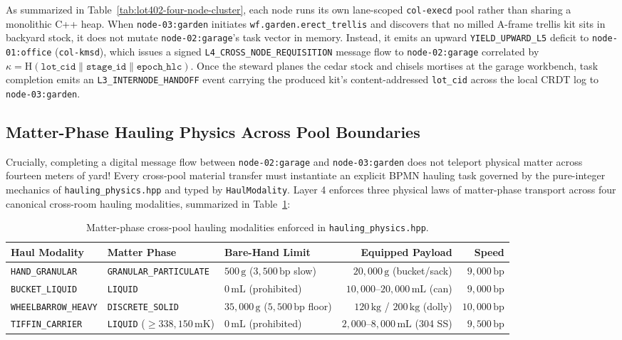 As summarized in Table~\ref{tab:lot402-four-node-cluster}, each node runs its own lane-scoped
\texttt{col-execd} pool rather than sharing a monolithic C++ heap. When
\texttt{node-03:garden} initiates \texttt{wf.garden.erect\_trellis} and discovers that no
milled A-frame trellis kit sits in backyard stock, it does not mutate
\texttt{node-02:garage}'s task vector in memory. Instead, it emits an upward
\texttt{YIELD\_UPWARD\_L5} deficit to \texttt{node-01:office} (\texttt{col-kmsd}), which
issues a signed \texttt{L4\_CROSS\_NODE\_REQUISITION} message flow to \texttt{node-02:garage}
correlated by $\kappa = \mathrm{H}(\texttt{lot\_cid} \parallel \texttt{stage\_id} \parallel
\texttt{epoch\_hlc})$. Once the steward planes the cedar stock and chisels mortises at the
garage workbench, task completion emits an \texttt{L3\_INTERNODE\_HANDOFF} event carrying the
produced kit's content-addressed \texttt{lot\_cid} across the local CRDT log
\parencite{shapiro2011crdt} to \texttt{node-03:garden}.

\subsection{Matter-Phase Hauling Physics Across Pool Boundaries}

Crucially, completing a digital message flow between \texttt{node-02:garage} and
\texttt{node-03:garden} does not teleport physical matter across fourteen meters of yard!
Every cross-pool material transfer must instantiate an explicit BPMN hauling task governed by
the pure-integer mechanics of \texttt{hauling\_physics.hpp} and typed by \texttt{HaulModality}.
Layer 4 enforces three physical laws of matter-phase transport across four canonical
cross-room hauling modalities, summarized in Table~\ref{tab:haul-modality-laws}:

\begin{table}[htbp]
\centering
\caption{Matter-phase cross-pool hauling modalities enforced in \texttt{hauling\_physics.hpp}.}
\label{tab:haul-modality-laws}
\footnotesize
\begin{tabular}{@{}lllrr@{}}
\toprule
\textbf{Haul Modality} & \textbf{Matter Phase} & \textbf{Bare-Hand Limit} & \textbf{Equipped Payload} & \textbf{Speed} \\
\midrule
\texttt{HAND\_GRANULAR} & \texttt{GRANULAR\_PARTICULATE} & $500\,\mathrm{g}$ ($3{,}500\,\mathrm{bp}$ slow) & $20{,}000\,\mathrm{g}$ (bucket/sack) & $9{,}000\,\mathrm{bp}$ \\
\texttt{BUCKET\_LIQUID} & \texttt{LIQUID} & $0\,\mathrm{mL}$ (prohibited) & $10{,}000\text{--}20{,}000\,\mathrm{mL}$ (can) & $9{,}000\,\mathrm{bp}$ \\
\texttt{WHEELBARROW\_HEAVY} & \texttt{DISCRETE\_SOLID} & $35{,}000\,\mathrm{g}$ ($5{,}500\,\mathrm{bp}$ floor) & $120\,\mathrm{kg}$ / $200\,\mathrm{kg}$ (dolly) & $10{,}000\,\mathrm{bp}$ \\
\texttt{TIFFIN\_CARRIER} & \texttt{LIQUID} ($\ge 338{,}150\,\mathrm{mK}$) & $0\,\mathrm{mL}$ (prohibited) & $2{,}000\text{--}8{,}000\,\mathrm{mL}$ (304 SS) & $9{,}500\,\mathrm{bp}$ \\
\bottomrule
\end{tabular}
\end{table}

